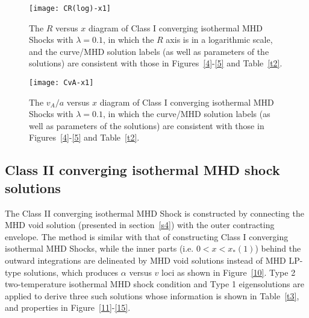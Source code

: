 \documentclass[fleqn,usenatbib]{mnras}
\begin{document}
\begin{figure}
\centering
\texttt{[image: CR(log)-x1]}
\caption{The $R$ versus $x$ diagram of Class I converging isothermal MHD Shocks with $\lambda=0.1$, in which the $R$ axis is in a logarithmic scale, and the curve/MHD solution labels (as well as parameters of the solutions) are consistent with those in Figures~\ref{4}-\ref{5} and Table~\ref{t2}. 
}
\label{8}
\end{figure}

\begin{figure}
\centering
\texttt{[image: CvA-x1]}
\caption{The $v_{A}/a$ versus $x$ diagram of Class I converging isothermal MHD Shocks with $\lambda=0.1$, in which the curve/MHD solution labels (as well as parameters of the solutions) are consistent with those in Figures~\ref{4}-\ref{5} and Table~\ref{t2}.}
\label{9}
\end{figure}

\subsection{Class II converging isothermal MHD shock solutions}
\label{s5.2}
The Class II converging isothermal MHD Shock is constructed by connecting the MHD void solution (presented in section~\ref{s4}) with the outer contracting envelope. The method is similar with that of constructing Class I converging isothermal MHD Shocks, while the inner parts (i.e. $0<x<x_{*}(1)$) behind the outward integrations are delineated by MHD void solutions instead of MHD LP-type solutions, which produces $\alpha$ versus $v$ loci as shown in Figure~\ref{10}. Type 2 two-temperature isothermal MHD shock condition and Type 1 eigensolutions are applied to derive three such solutions whose information is shown in Table~\ref{t3}, and properties in Figure~\ref{11}-\ref{15}. 
\end{document}
